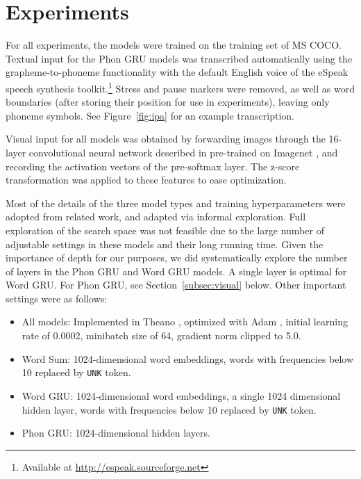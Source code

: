 \section{Experiments}
\label{sec:experiments}

For all experiments, the models were trained on the training set of MS COCO. Textual input for the {\sc Phon GRU} models was transcribed automatically using the grapheme-to-phoneme functionality with the default English voice of the eSpeak speech synthesis toolkit.\footnote{Available at \url{http://espeak.sourceforge.net}} Stress and pause markers were removed, as well as word boundaries (after storing their position for use in experiments), leaving only phoneme symbols. See Figure~\ref{fig:ipa} for an example transcription.


Visual input for all models was obtained by forwarding images through the 16-layer convolutional neural network described in  pre-trained on Imagenet \cite{ILSVRCarxiv14}, and recording the activation vectors of the pre-softmax layer. The z-score transformation was applied to these features to ease optimization. 

Most of the details of the three model types and training
hyperparameters were adopted from related work, and adapted via
informal exploration. Full exploration of the search space was not feasible due to the large number of adjustable settings in these models and their long running time. Given the importance of depth for our purposes, we did systematically explore the number of layers in the {\sc Phon GRU} and {\sc Word GRU} models. A single layer is optimal for {\sc Word GRU}. For {\sc Phon GRU}, see Section~\ref{subsec:visual} below. Other important settings were as follows:
\begin{itemize}
\setlength\itemsep{-0.5em}
\item All models: Implemented in Theano \cite{Bastien-Theano-2012}, optimized with 
  Adam \cite{DBLP:journals/corr/KingmaB14}, initial learning rate of 0.0002, minibatch size
  of 64, gradient norm clipped to 5.0.
\item {\sc Word Sum}: 1024-dimensional word embeddings, words with frequencies below 10 replaced by {\tt UNK} token.
\item {\sc Word GRU}: 1024-dimensional word embeddings, a single 1024 dimensional hidden layer, words with frequencies below 10 replaced by {\tt UNK} token.
\item {\sc Phon GRU}: 1024-dimensional hidden layers.
\end{itemize}

